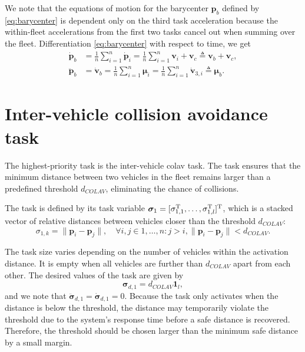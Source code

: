 We note that the equations of motion for the barycenter $\mathbf{p}_b$ defined by \eqref{eq:barycenter} is dependent only on the third task acceleration because the within-fleet accelerations from the first two tasks cancel out when summing over the fleet. Differentiation \eqref{eq:barycenter} with respect to time, we get
\begin{subequations}\label{eq:barycenter_EOM}
    \begin{align}
        \dot{\mathbf{p}}_b &=  \frac{1}{n} \sum_{i=1}^n \dot{\mathbf{p}}_i = \frac{1}{n} \sum_{i=1}^n \mathbf{v}_i + \mathbf{v}_c \triangleq \mathbf{v}_b + \mathbf{v}_c,\\
        \ddot{\mathbf{p}}_b &= \dot{\mathbf{v}}_b = \frac{1}{n}\sum_{i=1}^n \bm{\mu}_i= \frac{1}{n}\sum_{i=1}^n\dot{\mathbf{v}}_{3,i} \triangleq \bm{\mu}_b.
    \end{align}
\end{subequations}

\section{Inter-vehicle collision avoidance task}\label{sec:inter_vehicle}
The highest-priority task is the inter-vehicle \gls{colav} task. The task ensures that the minimum distance between two vehicles in the fleet remains larger than a predefined threshold $d_{COLAV}$, eliminating the chance of collisions. 

The task is defined by its task variable $\bm{\sigma}_1 = [\sigma_{1,1}^{\rm T}, \ldots, \sigma_{1,l}^{\rm T}]^{\rm T}$, which is a stacked vector of relative distances between vehicles closer than the threshold $d_{COLAV}$:
\begin{equation}
    \sigma_{1,k} = \|\mathbf{p}_i - \mathbf{p}_j\|, \quad \forall i,j \in {1, \ldots, n}: j > i,
    \|\mathbf{p}_i - \mathbf{p}_j\| < d_{COLAV}.
\end{equation}

The task size varies depending on the number of vehicles within the activation distance. It is empty when all vehicles are further than $d_{COLAV}$ apart from each other. The desired values of the task are given by
\begin{equation}
    \bm{\sigma}_{d,1} = d_{COLAV} \mathbf{1}_l,
\end{equation}
and we note that $\ddot{\bm{\sigma}}_{d,1} = \dot{\bm{\sigma}}_{d,1}= 0$. Because the task only activates when the distance is below the threshold, the distance may temporarily violate the threshold due to the system's response time before a safe distance is recovered. Therefore, the threshold should be chosen larger than the minimum safe distance by a small margin.

